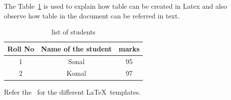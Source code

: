 The Table~\ref{tab:listOfStudents} is used to explain how table can be created in Latex and also observe how table in the document can be referred  in text.


\begin{table}[htbp]
	\centering
		\begin{tabular}{|c|c|c|}
			\hline Roll No & Name of the student & marks \\
			\hline 1 & Sonal & 95 \\
			\hline 2 & Komal & 97 \\
			\hline
\end{tabular}
\caption{list of students}
\label{tab:listOfStudents}
\end{table}


Refer the~\cite{sanjay} for the different \LaTeX\ templates.
